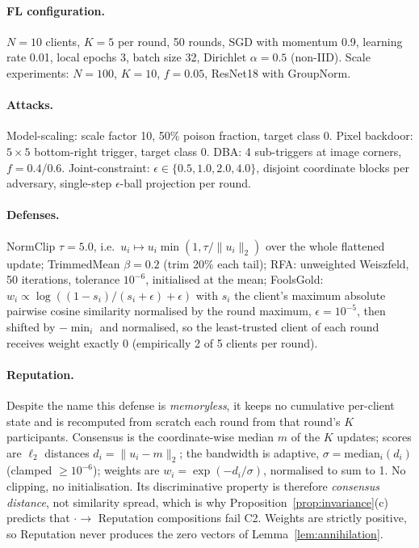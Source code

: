 \documentclass{article}
\begin{document}
\paragraph{FL configuration.} $N{=}10$ clients, $K{=}5$ per round, 50 rounds, SGD with momentum 0.9, learning rate 0.01, local epochs 3, batch size 32, Dirichlet $\alpha{=}0.5$ (non-IID). Scale experiments: $N{=}100$, $K{=}10$, $f{=}0.05$, ResNet18 with GroupNorm.

\paragraph{Attacks.} Model-scaling: scale factor 10, 50\% poison fraction, target class 0. Pixel backdoor: $5{\times}5$ bottom-right trigger, target class 0. DBA: 4 sub-triggers at image corners, $f{=}0.4$/$0.6$. Joint-constraint: $\epsilon \in \{0.5, 1.0, 2.0, 4.0\}$, disjoint coordinate blocks per adversary, single-step $\epsilon$-ball projection per round.

\paragraph{Defenses.} NormClip $\tau{=}5.0$, i.e.\ $u_i \mapsto u_i\min(1, \tau/\|u_i\|_2)$ over the whole flattened update; TrimmedMean $\beta{=}0.2$ (trim 20\% each tail); RFA: unweighted Weiszfeld, 50 iterations, tolerance $10^{-6}$, initialised at the mean; FoolsGold: $w_i \propto \log((1-s_i)/(s_i+\epsilon)+\epsilon)$ with $s_i$ the client's maximum absolute pairwise cosine similarity normalised by the round maximum, $\epsilon{=}10^{-5}$, then shifted by $-\min_i$ and normalised, so the least-trusted client of each round receives weight exactly $0$ (empirically 2 of 5 clients per round).

\paragraph{Reputation.} Despite the name this defense is \emph{memoryless}, it keeps no cumulative per-client state and is recomputed from scratch each round from that round's $K$ participants. Consensus is the coordinate-wise median $m$ of the $K$ updates; scores are $\ell_2$ distances $d_i = \|u_i - m\|_2$; the bandwidth is adaptive, $\sigma = \mathrm{median}_i(d_i)$ (clamped $\geq 10^{-6}$); weights are $w_i = \exp(-d_i/\sigma)$, normalised to sum to 1. No clipping, no initialisation. Its discriminative property is therefore \emph{consensus distance}, not similarity spread, which is why Proposition~\ref{prop:invariance}(c) predicts that $\cdot \to$ Reputation compositions fail C2. Weights are strictly positive, so Reputation never produces the zero vectors of Lemma~\ref{lem:annihilation}.
\end{document}
